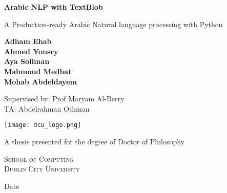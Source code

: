 \begin{titlepage}
    \begin{center}
        \vspace*{1cm}
        
        \Huge
        \textbf{Arabic NLP with TextBlob}
        
        \vspace{0.5cm}
        
        \LARGE
        A Production-ready Arabic Natural language processing with Python 
        
        \vspace{1.5cm}
        
        \Large
        \textbf{Adham Ehab} \\
        \textbf{Ahmed Yousry}\\
        \textbf{Aya Soliman}\\
        \textbf{Mahmoud Medhat}\\
        \textbf{Mohab Abdeldayem}\\
        
        \vspace{0.5cm}
        
        Supervised by: Prof Maryam Al-Berry \\
                       TA: Abdelrahman Othman\\
        
        
        \vfill
        
        \texttt{[image: dcu\_logo.png]}
        
        \vspace{0.8cm}
        
        \Large
        A thesis presented for the degree of Doctor of Philosophy
        
        \vspace{0.5cm}
        
        \LARGE
	    \textsc{School of Computing\\
	    Dublin City University}
	    
	    \begin{flushright}
	
	    \Large
	    Date
	
	    \end{flushright}
        
    \end{center}
\end{titlepage}